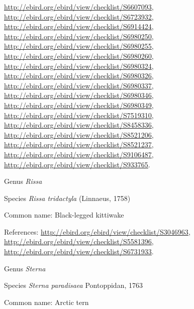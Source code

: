 \documentclass[9pt, article]{memoir}
\begin{document}
\begin{multicols}{2}
\url{http://ebird.org/ebird/view/checklist/S6607093}, 
\url{http://ebird.org/ebird/view/checklist/S6723932}, 
\url{http://ebird.org/ebird/view/checklist/S6914424}, 
\url{http://ebird.org/ebird/view/checklist/S6980250}, 
\url{http://ebird.org/ebird/view/checklist/S6980255}, 
\url{http://ebird.org/ebird/view/checklist/S6980260}, 
\url{http://ebird.org/ebird/view/checklist/S6980324}, 
\url{http://ebird.org/ebird/view/checklist/S6980326}, 
\url{http://ebird.org/ebird/view/checklist/S6980337}, 
\url{http://ebird.org/ebird/view/checklist/S6980346}, 
\url{http://ebird.org/ebird/view/checklist/S6980349}, 
\url{http://ebird.org/ebird/view/checklist/S7519310}, 
\url{http://ebird.org/ebird/view/checklist/S8458336}, 
\url{http://ebird.org/ebird/view/checklist/S8521206}, 
\url{http://ebird.org/ebird/view/checklist/S8521237}, 
\url{http://ebird.org/ebird/view/checklist/S9106487}, 
\url{http://ebird.org/ebird/view/checklist/S933765}.

\vspace{6pt}\noindent\hspace{30pt}Genus \textit{Rissa}


\vspace{6pt}\noindent\hspace{36pt}Species \textit{Rissa tridactyla} (Linnaeus, 1758)


Common name: Black-legged kittiwake

References: 
\url{http://ebird.org/ebird/view/checklist/S3046963}, 
\url{http://ebird.org/ebird/view/checklist/S5581396}, 
\url{http://ebird.org/ebird/view/checklist/S6731933}.

\vspace{6pt}\noindent\hspace{30pt}Genus \textit{Sterna}


\vspace{6pt}\noindent\hspace{36pt}Species \textit{Sterna paradisaea} Pontoppidan, 1763


Common name: Arctic tern


\end{multicols}
\end{document}
